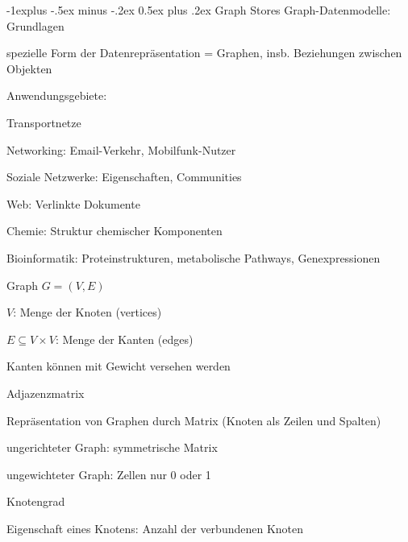 \documentclass[a4paper]{article}
\makeatletter
\renewcommand{\subsection}{\@startsection{subsection}{2}{0mm}%
                                {-1explus -.5ex minus -.2ex}%
                                {0.5ex plus .2ex}%
                                {\normalfont\normalsize\bfseries}}
\makeatother
\begin{document}
\begin{multicols}{3}
\begin{itemize*}
        \subsection{Graph Stores}
        Graph-Datenmodelle: Grundlagen
        \begin{itemize*}
            \item spezielle Form der Datenrepräsentation = Graphen, insb. Beziehungen zwischen Objekten
            \item Anwendungsgebiete:
            \begin{itemize*}
                \item Transportnetze
                \item Networking: Email-Verkehr, Mobilfunk-Nutzer
                \item Soziale Netzwerke: Eigenschaften, Communities
                \item Web: Verlinkte Dokumente
                \item Chemie: Struktur chemischer Komponenten
                \item Bioinformatik: Proteinstrukturen, metabolische Pathways, Genexpressionen
            \end{itemize*}
            \item Graph $G = (V, E)$
            \begin{itemize*}
                \item $V$: Menge der Knoten (vertices)
                \item $E \subseteq V \times V$: Menge der Kanten (edges)
                \item Kanten können mit Gewicht versehen werden
            \end{itemize*}
            \item Adjazenzmatrix
            \begin{itemize*}
                \item Repräsentation von Graphen durch Matrix (Knoten als Zeilen und Spalten)
                \item ungerichteter Graph: symmetrische Matrix
                \item ungewichteter Graph: Zellen nur 0 oder 1
            \end{itemize*}
            \item Knotengrad
            \begin{itemize*}
                \item Eigenschaft eines Knotens: Anzahl der verbundenen Knoten

\end{itemize*}
\end{itemize*}
\end{itemize*}
\end{multicols}
\end{document}
